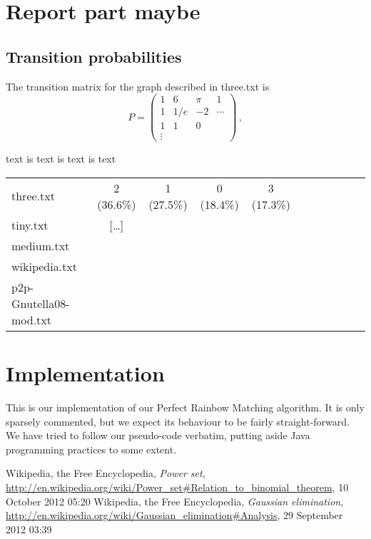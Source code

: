 \documentclass{tufte-handout}
\begin{document}
\section{Report part maybe}

\subsection{Transition probabilities}

The transition matrix for the graph described in three.txt
is
\begin{equation*}
P = 
\left(
\begin{array}{cccc}
1 & 6 & \pi & 1\\
1 & 1/e & -2  & \cdots\\
1 & 1 & 0 \\
\vdots
\end{array}
\right)\,,
\end{equation*}

\noindent text is text is text is text

\medskip
\begin{fullwidth}
\small
\begin{tabular}{lcccccccccc}
three.txt & 2 (36.6\%) & 1 (27.5\%) & 0 (18.4\%) & 3 (17.3\%) \\
tiny.txt & [\ldots] &\\
medium.txt &\\
wikipedia.txt & \\
p2p-Gnutella08-mod.txt &
\end{tabular}
\end{fullwidth}

\appendix

\section{Implementation}
This is our implementation of our Perfect Rainbow Matching algorithm. It is only sparsely commented, but we expect its behaviour to be fairly straight-forward. We have tried to follow our pseudo-code verbatim, putting aside Java programming practices to some extent.

\begin{thebibliography}{9}
 Wikipedia, the Free Encyclopedia, \emph{Power set},  \url{http://en.wikipedia.org/wiki/Power_set#Relation_to_binomial_theorem}, 10 October 2012 05:20
 Wikipedia, the Free Encyclopedia, \emph{Gaussian elimination}, \url{http://en.wikipedia.org/wiki/Gaussian_elimination#Analysis}, 29 September 2012 03:39
\end{thebibliography}
\end{document}
